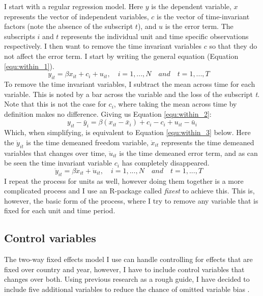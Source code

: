 I start with a regular regression model. Here $y$ is the dependent variable, $x$ represents the vector of independent variables, $c$ is the vector of time-invariant factors (note the absence of the subscript $t$), and $u$ is the error term. The subscripts $i$ and $t$ represents the individual unit and time specific observations respectively. I then want to remove the time invariant variables $c$ so that they do not affect the error term. I start by writing the general equation (Equation \ref{equ:within_1}).
\begin{equation}
    y_{it} = \beta x_{it} + c_i + u_{it}, \quad i = 1,..., N \quad and \quad  t = 1,..., T  \quad
\label{equ:within_1}
\end{equation} 
To remove the time invariant variables, I subtract the mean across time for each variable. This is noted by a bar across the variable and the loss of the subscript \textit{t}. Note that this is not the case for $c_i$, where taking the mean across time by definition makes no difference. Giving us Equation \ref{equ:within_2}:
\begin{equation}
    y_{it} - \bar{y}_i = \beta (x_{it} - \bar{x}_i) + c_i - c_i + u_{it} - \bar{u}_i
\label{equ:within_2}
\end{equation}
Which, when simplifying, is equivalent to Equation \ref{equ:within_3} below. Here the $\ddot{y}_{it}$ is the time demeaned freedom variable, $\ddot{x}_{it}$ represents the time demeaned variables that changes over time, $\ddot{u}_{it}$ is the time demeaned error term, and as can be seen the time invariant variable $c_i$ has completely disappeared. 
\begin{equation}
    \ddot{y}_{it} = \beta \ddot{x}_{it} + \ddot{u}_{it}, \quad i = 1,..., N \quad and \quad  t = 1,..., T  \quad 
\label{equ:within_3}
\end{equation}
I repeat the process for units as well, however doing them together is a more complicated process and I use an R-package called \textit{fixest} \citep{berge_efficient_2018} to achieve this. This is, however, the basic form of the process, where I try to remove any variable that is fixed for each unit and time period.

\subsection{Control variables} \label{control}
The two-way fixed effects model I use can handle controlling for effects that are fixed over country and year, however, I have to include control variables that changes over both. Using previous research \citep{gamso_is_2021, toettoe_foreign_2023} as a rough guide, I have decided to include five additional variables to reduce the chance of omitted variable bias \citep[pp. 81-85]{wooldridge_econometric_2010}.

